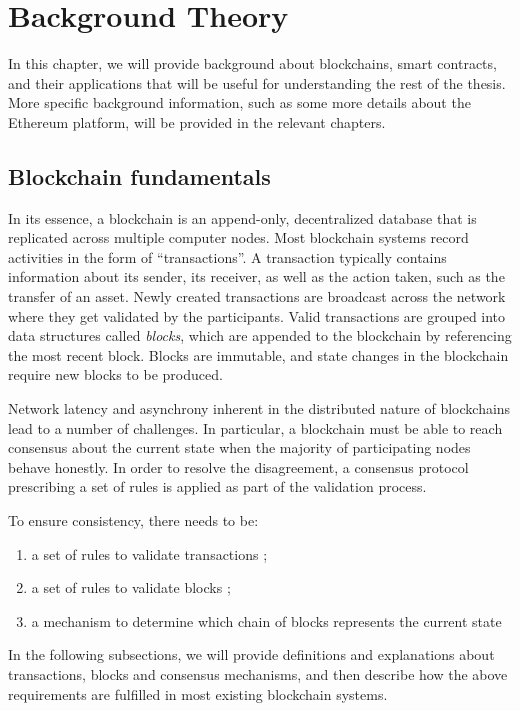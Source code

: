 \chapter{Background Theory}
\label{ch:background}

In this chapter, we will provide background about blockchains, smart contracts, and their applications that will be useful for understanding the rest of the thesis.
More specific background information, such as some more details about the Ethereum platform, will be provided in the relevant chapters.

\section{Blockchain fundamentals}
In its essence, a blockchain is an append-only, decentralized database that is replicated across multiple computer nodes. 
Most blockchain systems record activities in the form of ``transactions''. 
A transaction typically contains information about its sender, its receiver, as well as the action taken, such as the transfer of an asset. 
Newly created transactions are broadcast across the network where they get validated by the participants. 
Valid transactions are grouped into data structures called \textit{blocks}, which are appended to the blockchain by referencing the most recent block.
Blocks are immutable, and state changes in the blockchain require new blocks to be produced.

Network latency and asynchrony inherent in the distributed nature of blockchains lead to a number of challenges. 
In particular, a blockchain must be able to reach consensus about the current state when the majority of participating nodes behave honestly. 
In order to resolve the disagreement, a consensus protocol prescribing a set of rules is applied as part of the validation process. 

To ensure consistency, there needs to be:

\begin{enumerate}\itemsep=-1pt
\item a set of rules to validate transactions \label{req1};
\item a set of rules to validate blocks \label{req2};
\item a mechanism to determine which chain of blocks represents the current state \label{req3}
\end{enumerate}

%
In the following subsections, we will provide definitions and explanations about transactions, blocks and consensus mechanisms, and then describe how the above requirements are fulfilled in most existing blockchain systems.

